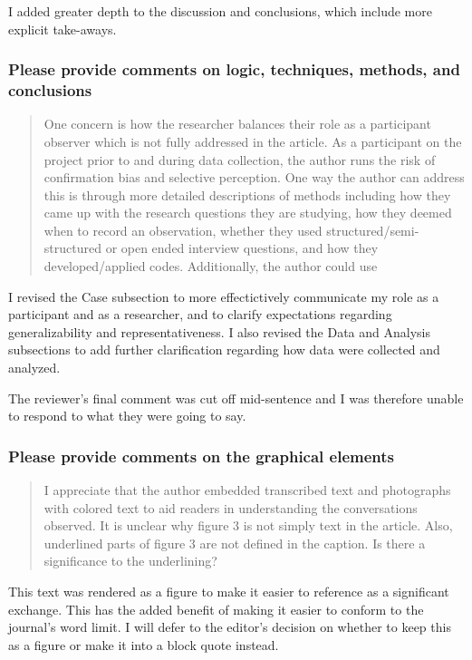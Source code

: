 \documentclass[
]{article}
\begin{document}
I added greater depth to the discussion and conclusions, which include
more explicit take-aways.

\subsubsection{Please provide comments on logic, techniques, methods,
and
conclusions}\label{please-provide-comments-on-logic-techniques-methods-and-conclusions}

\begin{quote}
One concern is how the researcher balances their role as a participant
observer which is not fully addressed in the article. As a participant
on the project prior to and during data collection, the author runs the
risk of confirmation bias and selective perception. One way the author
can address this is through more detailed descriptions of methods
including how they came up with the research questions they are
studying, how they deemed when to record an observation, whether they
used structured/semi-structured or open ended interview questions, and
how they developed/applied codes. Additionally, the author could use
\end{quote}

I revised the Case subsection to more effectictively communicate my role
as a participant and as a researcher, and to clarify expectations
regarding generalizability and representativeness. I also revised the
Data and Analysis subsections to add further clarification regarding how
data were collected and analyzed.

The reviewer's final comment was cut off mid-sentence and I was
therefore unable to respond to what they were going to say.

\subsubsection{Please provide comments on the graphical
elements}\label{please-provide-comments-on-the-graphical-elements-1}

\begin{quote}
I appreciate that the author embedded transcribed text and photographs
with colored text to aid readers in understanding the conversations
observed. It is unclear why figure 3 is not simply text in the article.
Also, underlined parts of figure 3 are not defined in the caption. Is
there a significance to the underlining?
\end{quote}

This text was rendered as a figure to make it easier to reference as a
significant exchange. This has the added benefit of making it easier to
conform to the journal's word limit. I will defer to the editor's
decision on whether to keep this as a figure or make it into a block
quote instead.
\end{document}
